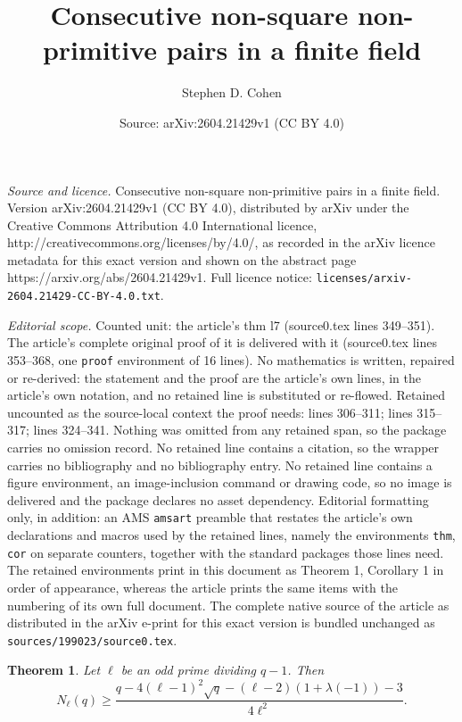 \documentclass[10pt,a4paper]{amsart}
\title{Consecutive non-square non-primitive pairs in a finite field}
\author{Stephen D. Cohen}
\date{Source: arXiv:2604.21429v1 (CC BY 4.0)}
\newtheorem{thm}{Theorem}
\begin{document}
\maketitle

\noindent\emph{Source and licence.} Consecutive non-square non-primitive pairs in a finite field. Version arXiv:2604.21429v1 (CC BY 4.0), distributed by arXiv under the Creative Commons Attribution 4.0 International licence, http://creativecommons.org/licenses/by/4.0/, as recorded in the arXiv licence metadata for this exact version and shown on the abstract page https://arxiv.org/abs/2604.21429v1. Full licence notice: \texttt{licenses/arxiv-2604.21429-CC-BY-4.0.txt}.\par\smallskip

\noindent\textit{Editorial scope.} Counted unit: the article's thm l7 (source0.tex lines 349--351). The article's complete original proof of it is delivered with it (source0.tex lines 353--368, one \texttt{proof} environment of 16 lines). No mathematics is written, repaired or re-derived: the statement and the proof are the article's own lines, in the article's own notation, and no retained line is substituted or re-flowed.  Retained uncounted as the source-local context the proof needs: lines 306--311; lines 315--317; lines 324--341.  Nothing was omitted from any retained span, so the package carries no omission record.  No retained line contains a citation, so the wrapper carries no bibliography and no bibliography entry.  No retained line contains a figure environment, an image-inclusion command or drawing code, so no image is delivered and the package declares no asset dependency.  Editorial formatting only, in addition: an AMS \texttt{amsart} preamble that restates the article's own declarations and macros used by the retained lines, namely the environments \texttt{thm}, \texttt{cor} on separate counters, together with the standard packages those lines need.  The retained environments print in this document as Theorem 1, Corollary 1 in order of appearance, whereas the article prints the same items with the numbering of its own full document.  The complete native source of the article as distributed in the arXiv e-print for this exact version is bundled unchanged as \texttt{sources/199023/source0.tex}.
\begin{thm}\label{thm:main}
Let $\ell$ be an odd prime dividing $q-1$. Then
\begin{equation}\label{mainbound}
N_\ell(q) \ge \frac{q - 4(\ell-1)^2 \sqrt{q} - (\ell-2)(1+\lambda(-1)) - 3}{4\ell^2}.
\end{equation}
\end{thm}
\end{document}
